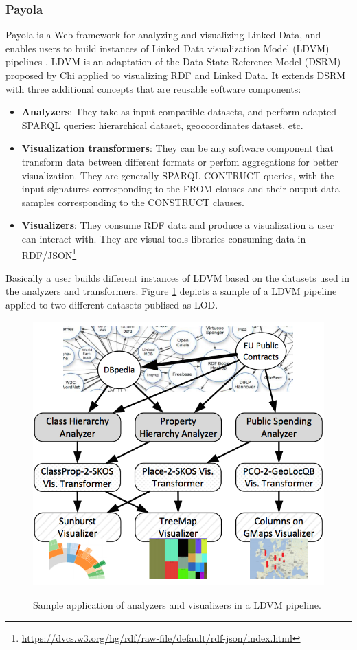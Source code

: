 \subsubsection{Payola}
Payola \cite{payola13} is a Web framework for analyzing and visualizing Linked Data, and enables users to build instances of Linked Data visualization Model (LDVM) pipelines \cite{brunetti13}. LDVM is an adaptation of the Data State Reference Model (DSRM) proposed by Chi \cite{chi2000} applied to visualizing RDF and Linked Data. It extends DSRM with three additional concepts that are reusable software components:
\begin{itemize}
\item \textbf{Analyzers}: They take as input compatible datasets, and perform adapted SPARQL queries: hierarchical dataset, geocoordinates dataset, etc.
\item \textbf{Visualization transformers}: They can be any software component that transform data between different formats or perfom aggregations for better visualization. They are generally SPARQL CONTRUCT queries, with the input signatures corresponding to the FROM clauses and their output data samples corresponding to the CONSTRUCT clauses.
\item \textbf{Visualizers}: They consume RDF data and produce a visualization a user can interact with. They are visual tools libraries consuming data in RDF/JSON\footnote{\url{https://dvcs.w3.org/hg/rdf/raw-file/default/rdf-json/index.html}}
\end{itemize}
Basically a user builds different instances of LDVM based on the datasets used in the analyzers and transformers. Figure \ref{fig:ldvm-lod} depicts a sample of a LDVM pipeline applied to two different datasets publised as LOD.

\begin{figure}
\center
\includegraphics[scale=0.8]{img/ldvm-lod.png}
\label{fig:ldvm-lod}
\caption{Sample application of analyzers and visualizers in a LDVM pipeline.}
\end{figure}


